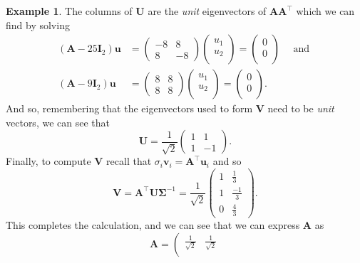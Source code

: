 \documentclass[]{book}
\theoremstyle{definition}
\theoremstyle{definition}
\newtheorem{example}{Example}[chapter]
\theoremstyle{definition}
\theoremstyle{remark}
\begin{document}
\begin{example}
The columns of \(\mathbf U\) are the \emph{unit} eigenvectors of \(\mathbf A\mathbf A^\top\) which we can find by solving
\begin{align*}(\mathbf A-25\mathbf I_2)\mathbf u&=\left(\begin{array}{cc}-8&8\\
               8&-8\end{array}\right)\left(\begin{array}{c}u_1\\u_2\\\end{array}\right)=\left(\begin{array}{c}0\\0\\\end{array}\right) \quad \mbox{ and }\\ (\mathbf A-9\mathbf I_2)\mathbf u&=\left(\begin{array}{cc}8&8\\
               8&8\end{array}\right)\left(\begin{array}{c}u_1\\u_2\\\end{array}\right)=\left(\begin{array}{c}0\\0\\\end{array}\right).\end{align*}
And so, remembering that the eigenvectors used to form \(\mathbf V\) need to be \emph{unit} vectors, we can see that
\[\mathbf U=\frac{1}{\sqrt{2}}\left(\begin{array}{cc}1&1\\
               1&-1\end{array}\right).\]
Finally, to compute \(\mathbf V\) recall that \(\sigma_i \mathbf v_i = \mathbf A^\top \mathbf u_i\) and so
\[\mathbf V= \mathbf A^\top\mathbf U\boldsymbol{\Sigma}^{-1} = \frac{1}{\sqrt{2}}\left(\begin{array}{cc}1&\frac{1}{3}\\
                                                           1&\frac{-1}{3}\\
                                                           0&\frac{4}{3}\end{array}\right).
\]
This completes the calculation, and we can see that we can express \(\mathbf A\) as
\[\mathbf A= \left(\begin{array}{cc}\frac{1}{\sqrt{2}}&\frac{1}{\sqrt{2}}\\

\end{array}\]
\end{example}
\end{document}
